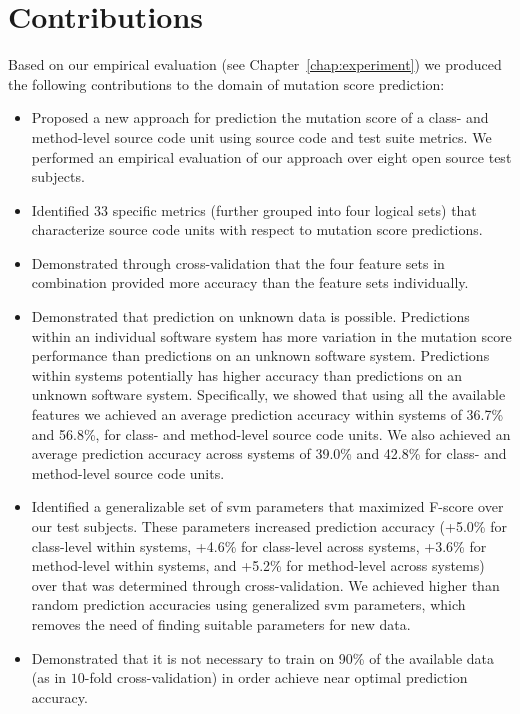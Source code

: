 \section{Contributions}
\label{sec:conclusions_contributions}
Based on our empirical evaluation (see Chapter~\ref{chap:experiment}) we produced the following contributions to the domain of mutation score prediction:

\begin{itemize}
  \item Proposed a new approach for prediction the mutation score of a class- and method-level source code unit using source code and test suite metrics. We performed an empirical evaluation of our approach over eight open source test subjects.
  \item Identified 33 specific metrics (further grouped into four logical sets) that characterize source code units with respect to mutation score predictions.
  \item Demonstrated through cross-validation that the four feature sets in combination provided more accuracy than the feature sets individually.
  \item Demonstrated that prediction on unknown data is possible. Predictions within an individual software system has more variation in the mutation score performance than predictions on an unknown software system. Predictions within systems potentially has higher accuracy than predictions on an unknown software system. Specifically, we showed that using all the available features we achieved an average prediction accuracy within systems of 36.7\% and 56.8\%, for class- and method-level source code units. We also achieved an average prediction accuracy across systems of 39.0\% and 42.8\% for class- and method-level source code units.
  \item Identified a generalizable set of \gls{svm} parameters that maximized F-score over our test subjects. These parameters increased prediction accuracy (+5.0\% for class-level within systems, +4.6\% for class-level across systems, +3.6\% for method-level within systems, and +5.2\% for method-level across systems) over that was determined through cross-validation. We achieved higher than random prediction accuracies using generalized \gls{svm} parameters, which removes the need of finding suitable parameters for new data.
  \item Demonstrated that it is not necessary to train on 90\% of the available data (as in $10$-fold cross-validation) in order achieve near optimal prediction accuracy.
\end{itemize}

